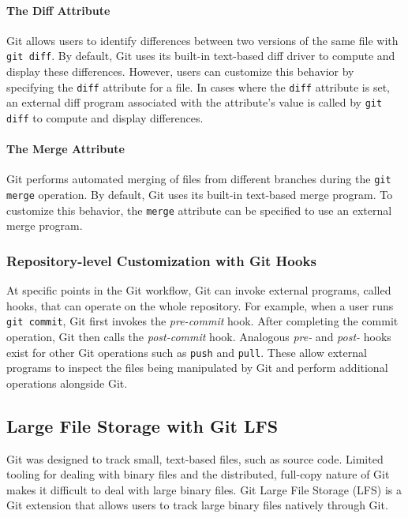 \documentclass[nohyperref]{article}
\def\code#1{\texttt{#1}}
\theoremstyle{plain}
\theoremstyle{definition}
\theoremstyle{remark}
\begin{document}
\paragraph{The Diff Attribute}
Git allows users to identify differences between two versions of the same file with \code{git diff}. By default, Git uses its built-in text-based diff driver to compute and display these differences. However, users can customize this behavior by specifying the \code{diff} attribute for a file. In cases where the \code{diff} attribute is set, an external diff program associated with the attribute's value is called by \code{git diff} to compute and display differences.

\paragraph{The Merge Attribute}
Git performs automated merging of files from different branches during the \code{git merge} operation. By default, Git uses its built-in text-based merge program. To customize this behavior, the \code{merge} attribute can be specified to use an external merge program.

\subsubsection{Repository-level Customization with Git Hooks}
At specific points in the Git workflow, Git can invoke external programs, called hooks, that can operate on the whole repository. For example, when a user runs \code{git commit}, Git first invokes the \emph{pre-commit} hook. After completing the commit operation, Git then calls the \emph{post-commit} hook. Analogous \emph{pre-} and \emph{post-} hooks exist for other Git operations such as \code{push} and \code{pull}. These allow external programs to inspect the files being manipulated by Git and perform additional operations alongside Git.

\subsection{Large File Storage with Git LFS} \label{ssec:git_lfs}
Git was designed to track small, text-based files, such as source code. Limited tooling for dealing with binary files and the distributed, full-copy nature of Git makes it difficult to deal with large binary files. Git Large File Storage (LFS) is a Git extension that allows users to track large binary files natively through Git. 
\end{document}
